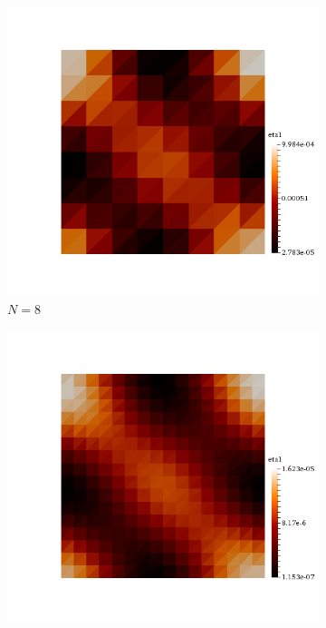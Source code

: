 \begin{figure}[h!]
  \centering
  \begin{subfigure}[b]{0.24\textwidth}
    \includegraphics[width=\textwidth,height=\textheight,keepaspectratio,height=\textheight,keepaspectratio]{figures/1_mpet/space/eta1_8.png}
    \caption{$N=8$}
  \end{subfigure}
  \begin{subfigure}[b]{0.24\textwidth}
    \includegraphics[width=\textwidth,height=\textheight,keepaspectratio,height=\textheight,keepaspectratio]{figures/1_mpet/space/eta1_16.png}

\end{subfigure}
\end{figure}
